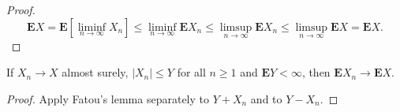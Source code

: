 \begin{proof}

\[
\mathbf{E} X = \mathbf{E} [\liminf_{n\to\infty} X_n] \le \liminf_{n\to\infty} \mathbf{E} X_n \le \limsup_{n\to\infty} \mathbf{E} X_n \le \limsup_{n\to\infty}  \mathbf{E} X = \mathbf{E} X.
\]

\end{proof}

\begin{thm}
If $X_n\to X$ almost surely, $|X_n|\le Y$ for all
$n\ge 1$ and $\mathbf{E} Y<\infty$, then
$\mathbf{E} X_n\to \mathbf{E} X$.
\end{thm}

\begin{proof}
Apply Fatou's lemma separately to $Y+X_n$ and to
$Y-X_n$.
\end{proof}
